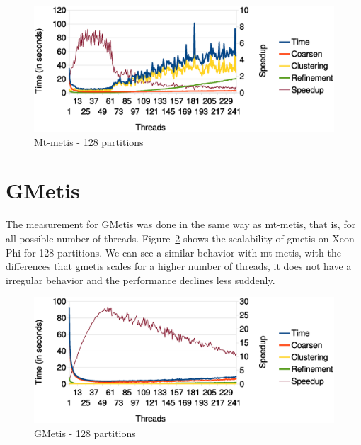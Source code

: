 \documentclass[abstract=on,9pt,twocolumn]{scrartcl}
\begin{document}
\begin{center}
\begin{figure}[htb]
    \includegraphics[width=\columnwidth]{img/mtmetis128.eps}
    \caption{Mt-metis - 128 partitions}
    \label{img:mtmetis128}
\end{figure}
\end{center}



\section{GMetis} 
\label{sec:gmetis}
The measurement for GMetis was done in the same way as mt-metis, that
is, for all possible number of threads. Figure~\ref{gmetis128} shows the
scalability of gmetis on Xeon Phi for 128 partitions. We can see a
similar behavior with mt-metis, with the differences that gmetis scales
for a higher number of threads, it does not have a irregular behavior
and the performance declines less suddenly.

\begin{center}
\begin{figure}[htb]
    \includegraphics[width=\columnwidth]{img/gmetis128.eps}
    \caption{GMetis - 128 partitions}
    \label{gmetis128}
\end{figure}
\end{center}
\end{document}
